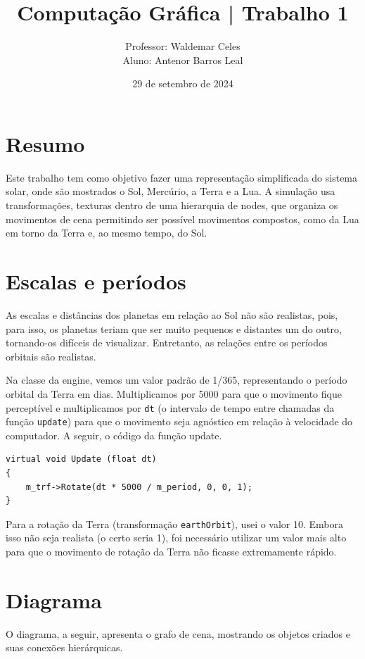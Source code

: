 \documentclass[11pt, a4paper]{article}
\title{Computação Gráfica | Trabalho 1}
\author{Professor: Waldemar Celes\\
Aluno: Antenor Barros Leal}
\date{29 de setembro de 2024}
\begin{document}
\maketitle

\section {Resumo}
Este trabalho tem como objetivo fazer uma representação simplificada do sistema 
solar, onde são mostrados o Sol, Mercúrio, a Terra e a Lua. A simulação 
usa transformações, texturas dentro de uma hierarquia de nodes, que organiza os
movimentos de cena permitindo ser possível movimentos compostos, como da Lua em
torno da Terra e, ao mesmo tempo, do Sol.

\section {Escalas e períodos}

As escalas e distâncias dos planetas em relação ao Sol não são realistas, pois, 
para isso, os planetas teriam que ser muito pequenos e distantes um do outro, 
tornando-os difíceis de visualizar. Entretanto, as relações entre os períodos 
orbitais são realistas.

Na classe da engine, vemos um valor padrão de 1/365, representando o período 
orbital da Terra em dias. Multiplicamos por 5000 para que o movimento fique 
perceptível e multiplicamos por \texttt{dt} (o intervalo de tempo entre 
chamadas da função \texttt{update}) para que o movimento seja agnóstico em 
relação à velocidade do computador. A seguir, o código da função update.

\begin{verbatim}
virtual void Update (float dt)
{
    m_trf->Rotate(dt * 5000 / m_period, 0, 0, 1);
}
\end{verbatim}

Para a rotação da Terra (transformação \texttt{earthOrbit}), usei o valor 10. 
Embora isso não seja realista (o certo seria 1), foi necessário utilizar um 
valor mais alto para que o movimento de rotação da Terra não ficasse extremamente 
rápido.

\section {Diagrama}

O diagrama, a seguir, apresenta o grafo de cena, mostrando os objetos criados e 
suas conexões hierárquicas.
\end{document}
